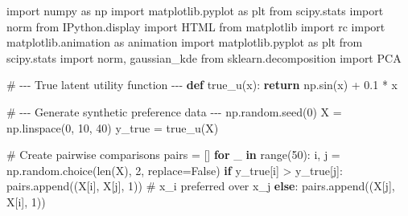 \documentclass[
  letterpaper,
  numbers=noenddot,
  DIV=11]{scrreprt}
\newenvironment{Shaded}{\begin{snugshade}}{\end{snugshade}}
\newcommand{\BuiltInTok}[1]{\textcolor[rgb]{0.00,0.23,0.31}{#1}}
\newcommand{\CommentTok}[1]{\textcolor[rgb]{0.37,0.37,0.37}{#1}}
\newcommand{\ControlFlowTok}[1]{\textcolor[rgb]{0.00,0.23,0.31}{\textbf{#1}}}
\newcommand{\DecValTok}[1]{\textcolor[rgb]{0.68,0.00,0.00}{#1}}
\newcommand{\FloatTok}[1]{\textcolor[rgb]{0.68,0.00,0.00}{#1}}
\newcommand{\ImportTok}[1]{\textcolor[rgb]{0.00,0.46,0.62}{#1}}
\newcommand{\KeywordTok}[1]{\textcolor[rgb]{0.00,0.23,0.31}{\textbf{#1}}}
\newcommand{\NormalTok}[1]{\textcolor[rgb]{0.00,0.23,0.31}{#1}}
\newcommand{\OperatorTok}[1]{\textcolor[rgb]{0.37,0.37,0.37}{#1}}
\newcommand{\VariableTok}[1]{\textcolor[rgb]{0.07,0.07,0.07}{#1}}
\theoremstyle{plain}
\theoremstyle{definition}
\theoremstyle{remark}
\begin{document}
\begin{Shaded}
\begin{Highlighting}[numbers=left,,]
\ImportTok{import}\NormalTok{ numpy }\ImportTok{as}\NormalTok{ np}
\ImportTok{import}\NormalTok{ matplotlib.pyplot }\ImportTok{as}\NormalTok{ plt}
\ImportTok{from}\NormalTok{ scipy.stats }\ImportTok{import}\NormalTok{ norm}
\ImportTok{from}\NormalTok{ IPython.display }\ImportTok{import}\NormalTok{ HTML}
\ImportTok{from}\NormalTok{ matplotlib }\ImportTok{import}\NormalTok{ rc}
\ImportTok{import}\NormalTok{ matplotlib.animation }\ImportTok{as}\NormalTok{ animation}
\ImportTok{import}\NormalTok{ matplotlib.pyplot }\ImportTok{as}\NormalTok{ plt}
\ImportTok{from}\NormalTok{ scipy.stats }\ImportTok{import}\NormalTok{ norm, gaussian\_kde}
\ImportTok{from}\NormalTok{ sklearn.decomposition }\ImportTok{import}\NormalTok{ PCA}

\CommentTok{\# {-}{-}{-} True latent utility function {-}{-}{-}}
\KeywordTok{def}\NormalTok{ true\_u(x):}
    \ControlFlowTok{return}\NormalTok{ np.sin(x) }\OperatorTok{+} \FloatTok{0.1} \OperatorTok{*}\NormalTok{ x}

\CommentTok{\# {-}{-}{-} Generate synthetic preference data {-}{-}{-}}
\NormalTok{np.random.seed(}\DecValTok{0}\NormalTok{)}
\NormalTok{X }\OperatorTok{=}\NormalTok{ np.linspace(}\DecValTok{0}\NormalTok{, }\DecValTok{10}\NormalTok{, }\DecValTok{40}\NormalTok{)}
\NormalTok{y\_true }\OperatorTok{=}\NormalTok{ true\_u(X)}

\CommentTok{\# Create pairwise comparisons}
\NormalTok{pairs }\OperatorTok{=}\NormalTok{ []}
\ControlFlowTok{for}\NormalTok{ \_ }\KeywordTok{in} \BuiltInTok{range}\NormalTok{(}\DecValTok{50}\NormalTok{):}
\NormalTok{    i, j }\OperatorTok{=}\NormalTok{ np.random.choice(}\BuiltInTok{len}\NormalTok{(X), }\DecValTok{2}\NormalTok{, replace}\OperatorTok{=}\VariableTok{False}\NormalTok{)}
    \ControlFlowTok{if}\NormalTok{ y\_true[i] }\OperatorTok{\textgreater{}}\NormalTok{ y\_true[j]:}
\NormalTok{        pairs.append((X[i], X[j], }\DecValTok{1}\NormalTok{))  }\CommentTok{\# x\_i preferred over x\_j}
    \ControlFlowTok{else}\NormalTok{:}
\NormalTok{        pairs.append((X[j], X[i], }\DecValTok{1}\NormalTok{))}


\end{Highlighting}
\end{Shaded}
\end{document}
